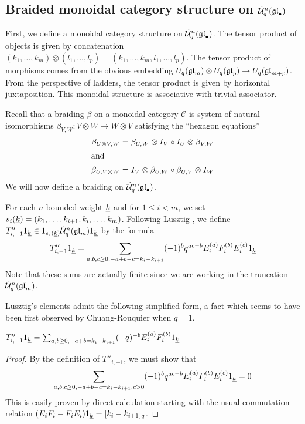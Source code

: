\documentclass[11pt]{amsart}
\begin{document}
\subsection{Braided monoidal category structure on $\dot{{\mathcal{U}}}_q^n({\mathfrak{gl}}_\bullet)$} \label{se:braiding}
First, we define a monoidal category structure on $\dot{{\mathcal{U}}}_q^n({\mathfrak{gl}}_\bullet)$.  The tensor product of objects is given by concatenation $(k_1, \dots, k_m) \otimes (l_1, \dots, l_p) = (k_1, \dots, k_m, l_1, \dots, l_p) $.  The tensor product of morphisms comes from the obvious embedding $ U_q({\mathfrak{gl}}_{m}) \otimes U_q({\mathfrak{gl}}_{p}) \rightarrow U_q({\mathfrak{gl}}_{m+p})$.  From the perspective of ladders, the tensor product is given by horizontal juxtaposition.  This monoidal structure is associative with trivial associator.

Recall that a braiding $\beta$ on a monoidal category $ \mathcal C$ is system of natural isomorphisms $\beta_{V, W} : V \otimes W \rightarrow W \otimes V $ satisfying the ``hexagon equations''
\begin{align} \label{eq:hex}
\beta_{U \otimes V, W} & = \beta_{U, W}  \otimes I_V \circ I_U \otimes \beta_{V, W} \\
\intertext{and}
\beta_{U, V \otimes W} & = I_V \otimes \beta_{U, W} \circ \beta_{U, V}  \otimes I_W \notag
\end{align}
We will now define a braiding on $ \dot{{\mathcal{U}}}_q^n({\mathfrak{gl}}_\bullet) $.

For each $n$-bounded weight $ {\underline{k}} $ and for $ 1 \le i < m $, we set $ s_i({\underline{k}}) = (k_1, \dots, k_{i+1}, k_i, \dots, k_m) $.  Following Lusztig \cite[5.2.1]{MR1227098}, we define $ T''_{i,-1} 1_{{\underline{k}}} \in 1_{s_i({\underline{k}})} \dot{{\mathcal{U}}}_q^n({\mathfrak{gl}}_m) 1_{{\underline{k}}} $ by the formula
\begin{equation}\label{eq:temp3}
T''_{i,-1} 1_{{\underline{k}}} = \sum_{a, b, c \ge 0, -a +b -c = k_i - k_{i+1}} (-1)^b q^{ac - b} E_i^{(a)} F_i^{(b)} E_i^{(c)} 1_{{\underline{k}}}
\end{equation}
Note that these sums are actually finite since we are working in the truncation $ \dot{{\mathcal{U}}}_q^n({\mathfrak{gl}}_m) $.


Lusztig's elements admit the following simplified form, a fact which seems to have been first observed by Chuang-Rouquier \cite{MR2373155} when $ q = 1 $.
\begin{lem} \label{le:singlesum}
$T''_{i,-1} 1_{{\underline{k}}} = \sum_{a, b \ge 0, -a +b = k_i - k_{i+1}} (-q)^{-b} E_i^{(a)} F_i^{(b)} 1_{{\underline{k}}} $
\end{lem}
\begin{proof}
By the definition of $ T''_{i,-1}$, we must show that
$$\sum_{a, b, c \ge 0, -a +b -c = k_i - k_{i+1}, c > 0 } (-1)^b q^{ac - b} E_i^{(a)} F_i^{(b)} E_i^{(c)} 1_{{\underline{k}}} = 0 $$
This is easily proven by direct calculation starting with the usual commutation relation $ (E_i F_i - F_i E_i)1_{{\underline{k}}} = [k_i - k_{i+1}]_q $.
\end{proof}
\end{document}
